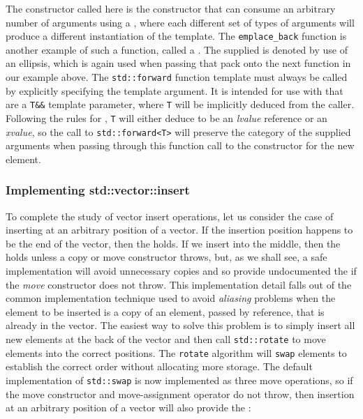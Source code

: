 \noindent The constructor called here is the 
constructor that can consume an arbitrary number of arguments using a
, where each different set of types of
arguments will produce a different instantiation of the template. The
\lstinline!emplace_back! function is another example of such a
 function, called a . The supplied  is denoted by
use of an ellipsis, which is again used when passing that pack onto the
next function in our example above. The \lstinline!std::forward! function
template must always be called by explicitly specifying the template
argument. It is intended for use with 
that are a \lstinline!T&&! template parameter, where \lstinline!T! will be
implicitly deduced from the caller. Following the rules for
, \lstinline!T! will either deduce to be an
\emph{lvalue} reference or an \emph{xvalue}, so the call to
\lstinline!std::forward<T>! will preserve the category of the supplied
arguments when passing through this function call to the constructor for
the new element.

\subsubsection[Implementing \lstinline!std::vector::insert!]{Implementing {\SubsubsecCode std::vector::insert}}\label{implementing-std::vector::insert}

To complete the study of vector insert operations, let us consider the
case of inserting at an arbitrary position of a vector. If the insertion
position happens to be the end of the vector, then the  holds. If we insert into the middle, then
the  holds unless a copy or move constructor
throws, but, as we shall see, a safe implementation will avoid
unnecessary copies and so provide undocumented the  if the \emph{move} constructor does not throw. This
implementation detail falls out of the common implementation technique
used to avoid \emph{aliasing} problems when the element to be inserted
is a copy of an element, passed by reference, that is already in the
vector. The easiest way to solve this problem is to simply insert all
new elements at the back of the vector and then call
\lstinline!std::rotate! to move elements into the correct positions. The
\lstinline!rotate! algorithm will \lstinline!swap! elements to establish the
correct order without allocating more storage. The default
implementation of \lstinline!std::swap! is now implemented as three move
operations, so if the move constructor and move-assignment operator do
not throw, then insertion at an arbitrary position of a vector will also
provide the :

